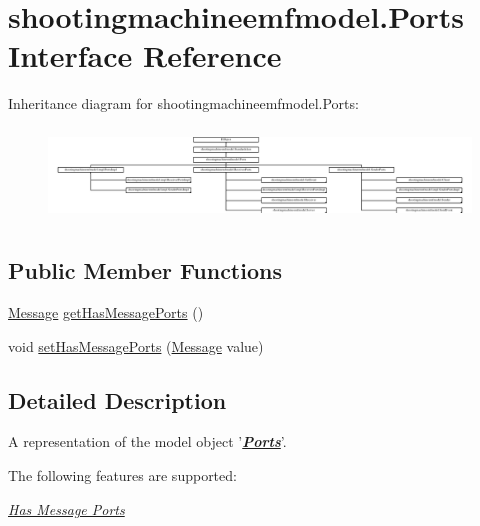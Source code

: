 \hypertarget{interfaceshootingmachineemfmodel_1_1_ports}{\section{shootingmachineemfmodel.\-Ports Interface Reference}
\label{interfaceshootingmachineemfmodel_1_1_ports}
}
Inheritance diagram for shootingmachineemfmodel.\-Ports\-:\begin{figure}[H]
\begin{center}
\leavevmode
\includegraphics[height=2.497213cm]{interfaceshootingmachineemfmodel_1_1_ports}
\end{center}
\end{figure}
\subsection*{Public Member Functions}
\begin{DoxyCompactItemize}
\item 
\hyperlink{interfaceshootingmachineemfmodel_1_1_message}{Message} \hyperlink{interfaceshootingmachineemfmodel_1_1_ports_a423cdad6c6f30b6ba1d86096fbc22ba3}{get\-Has\-Message\-Ports} ()
\item 
void \hyperlink{interfaceshootingmachineemfmodel_1_1_ports_af63ef6ff282e800cd00515a080ae62b5}{set\-Has\-Message\-Ports} (\hyperlink{interfaceshootingmachineemfmodel_1_1_message}{Message} value)
\end{DoxyCompactItemize}


\subsection{Detailed Description}
A representation of the model object '{\itshape {\bfseries \hyperlink{interfaceshootingmachineemfmodel_1_1_ports}{Ports}}}'.

The following features are supported\-: 
\begin{DoxyItemize}
\item \hyperlink{interfaceshootingmachineemfmodel_1_1_ports_a423cdad6c6f30b6ba1d86096fbc22ba3}{{\itshape Has Message Ports}} 
\end{DoxyItemize}

